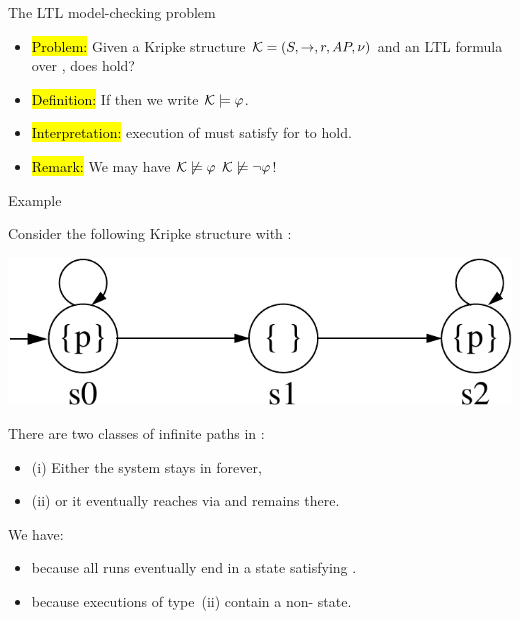 \begin{frame}{The LTL model-checking problem}
\begin{itemize}
\itemsep1em
\item\hl{Problem:} Given a Kripke structure
    ${\cal K}=(S,\mathord{\to},r,AP,\nu)$
   and an LTL formula \m{\phi} over , does
   hold?

\item\hl{Definition:} If 
  then we write ${\cal K}\models\phi$.

\item\hl{Interpretation:}  execution of  must 
  satisfy \m{\phi} for  to hold.

\item\hl{Remark:} We may have ${\cal K}\not\models\phi$
    ${\cal K}\not\models\neg\phi$!
\end{itemize}
\end{frame}


\begin{frame}{Example}

Consider the following Kripke structure  with :

\begin{center}
\includegraphics[scale=.4]{content/chapter_model_checking/model_checking/images/ctl-ltl}
\end{center}

\bigskip                  
There are two classes of infinite paths in :
\begin{itemize}
\item (i) Either the system stays in  forever,
\item (ii) or it eventually reaches  via  and remains there.
\end{itemize}

\bigskip
We have:
\begin{itemize}
\item {} because all runs eventually end in a state
   satisfying .
\item {} because executions of type~(ii) contain
   a non- state.
\end{itemize}

\end{frame}

